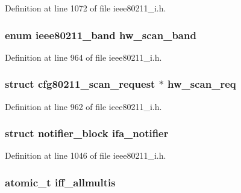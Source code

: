Definition at line 1072 of file ieee80211\-\_\-i.\-h.

\hypertarget{structieee80211__local_aba68e760b61a0482eed83d42e9df3f4d}{
\subsubsection[{hw\-\_\-scan\-\_\-band}]{\setlength{\rightskip}{0pt plus 5cm}enum ieee80211\-\_\-band hw\-\_\-scan\-\_\-band}}\label{structieee80211__local_aba68e760b61a0482eed83d42e9df3f4d}


Definition at line 964 of file ieee80211\-\_\-i.\-h.

\hypertarget{structieee80211__local_aec89fecf81c37f8d260d6d2e2697a463}{
\subsubsection[{hw\-\_\-scan\-\_\-req}]{\setlength{\rightskip}{0pt plus 5cm}struct cfg80211\-\_\-scan\-\_\-request $\ast$ hw\-\_\-scan\-\_\-req}}\label{structieee80211__local_aec89fecf81c37f8d260d6d2e2697a463}


Definition at line 962 of file ieee80211\-\_\-i.\-h.

\hypertarget{structieee80211__local_acb6a252b9a72983b1cd445b3f4e99f50}{
\subsubsection[{ifa\-\_\-notifier}]{\setlength{\rightskip}{0pt plus 5cm}struct notifier\-\_\-block ifa\-\_\-notifier}}\label{structieee80211__local_acb6a252b9a72983b1cd445b3f4e99f50}


Definition at line 1046 of file ieee80211\-\_\-i.\-h.

\hypertarget{structieee80211__local_ad49cfc0bfcbcee0e8082e1b209e97d31}{
\subsubsection[{iff\-\_\-allmultis}]{\setlength{\rightskip}{0pt plus 5cm}atomic\-\_\-t iff\-\_\-allmultis}}\label{structieee80211__local_ad49cfc0bfcbcee0e8082e1b209e97d31}



